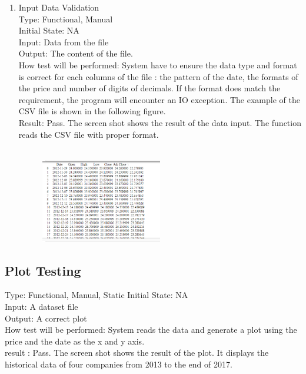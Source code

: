 \documentclass[12pt, titlepage]{article}
\begin{document}
\begin{enumerate}
\item{Input Data Validation \label{TestInput2}\\}
Type: Functional, Manual\\
Initial State: NA\\
Input: Data from the file\\
Output: The content of the file.\\
How test will be performed: System have to ensure the data type and format is
correct for each columns of the file : the pattern of the date, the formats
of the price and number of digits of decimals. If the format does match the requirement, the program will encounter an IO exception.
The example of the CSV file is shown in the following figure. \\
Result: Pass. The screen shot shows the result of the data input. The function reads the CSV file with proper format.\\
~\newline
\begin{figure}[h!]
\begin{center}
{
\includegraphics[width=0.5\textwidth]{datainputtest.png}
}
\caption{\label{Spark}}
\end{center}
\end{figure}
\end{enumerate}

\subsection{Plot Testing\\}

Type: Functional, Manual, Static
Initial State: NA\\
Input: A dataset file\\
Output: A correct plot\\
How test will be performed: System reads the data and generate a plot using the price and the date as the x and y axis.\\
result : Pass. The screen shot shows the result of the plot. It displays the historical data of four companies from 2013 to the end of 2017.\\
\end{document}
